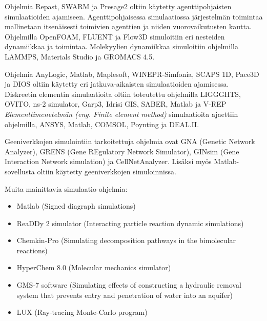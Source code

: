 \documentclass[utf8]{gradu3}
\begin{document}
Ohjelmia Repast, SWARM ja Presage2 oltiin käytetty agenttipohjaisten simulaatioiden ajamiseen.
Agenttipohjaisessa simulaatiossa järjestelmän toimintaa mallinetaan itsenäisesti toimivien
agenttien ja niiden vuorovaikutusten kautta.
Ohjelmilla OpenFOAM, FLUENT ja Flow3D simuloitiin eri nesteiden dynamiikkaa ja toimintaa.
Molekyylien dynamiikkaa simuloitiin ohjelmilla 
LAMMPS, Materials Studio ja GROMACS 4.5.

Ohjelmia AnyLogic, Matlab, Maplesoft, WINEPR-Simfonia, SCAPS 1D, Pace3D ja DIOS 
oltiin käytetty eri jatkuva-aikaisten simulaatioiden ajamisessa.
Diskreetin elementin simulaatioita oltiin toteutettu ohjelmilla
LIGGGHTS, OVITO, ns-2 simulator, Garp3, Idrisi GIS, SABER, Matlab ja V-REP
\textit{Elementtimenetelmän (eng. Finite element method)} simulaatioita
ajaettiin ohjelmilla, ANSYS, Matlab, COMSOL, Poynting ja DEAL.II.

Geeniverkkojen simulointiin tarkoitettuja ohjelmia ovat
GNA (Genetic Network Analyzer), 
GRENS (Gene REgulatory Network Simulator),
GINsim (Gene Interaction Network simulation) ja CellNetAnalyzer.
Lisäksi myös Matlab-sovellusta oltiin käytetty geeniverkkojen simuloinnissa.

Muita mainittavia simulaatio-ohjelmia:
\begin{itemize}
    \item Matlab (Signed diagraph simulations)
    \item ReaDDy 2 simulator (Interacting particle reaction dynamic simulations)
    \item Chemkin-Pro (Simulating decomposition pathways in the bimolecular reactions)
    \item HyperChem 8.0 (Molecular mechanics simulator)
    \item GMS-7 software (Simulating effects of constructing a hydraulic removal system that prevents entry and penetration of water into an aquifer)
    \item LUX (Ray-tracing Monte-Carlo program)
\end{itemize}
\end{document}

